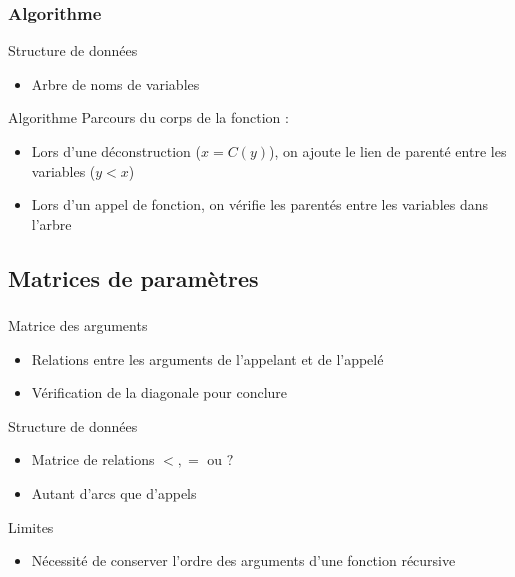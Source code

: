 \begin{frame}
  \frametitle{Algorithme}
  \begin{block}{Structure de données}
    \begin{itemize}
    \item Arbre de noms de variables
    \end{itemize}
  \end{block}
  \begin{block}{Algorithme}
    Parcours du corps de la fonction :
    \begin{itemize}
      \item Lors d'une déconstruction ($x = C(y)$), on ajoute le lien de parenté entre les variables ($y < x$)
      \item Lors d'un appel de fonction, on vérifie les parentés entre les variables dans l'arbre
    \end{itemize}
  \end{block}
\end{frame}

\subsection{Matrices de paramètres}

\begin{frame}
  \frametitle{}
  \begin{block}{Matrice des arguments}
    \begin{itemize}
      \item Relations entre les arguments de l'appelant et de l'appelé
      \item Vérification de la diagonale pour conclure
    \end{itemize}
  \end{block}
  \begin{block}{Structure de données}
    \begin{itemize}
    \item Matrice de relations $<, =$ ou $?$
    \item Autant d'arcs que d'appels
    \end{itemize}
  \end{block}
  \begin{block}{Limites}
    \begin{itemize}
      \item Nécessité de conserver l'ordre des arguments d'une fonction récursive
    \end{itemize}
  \end{block}
\end{frame}

